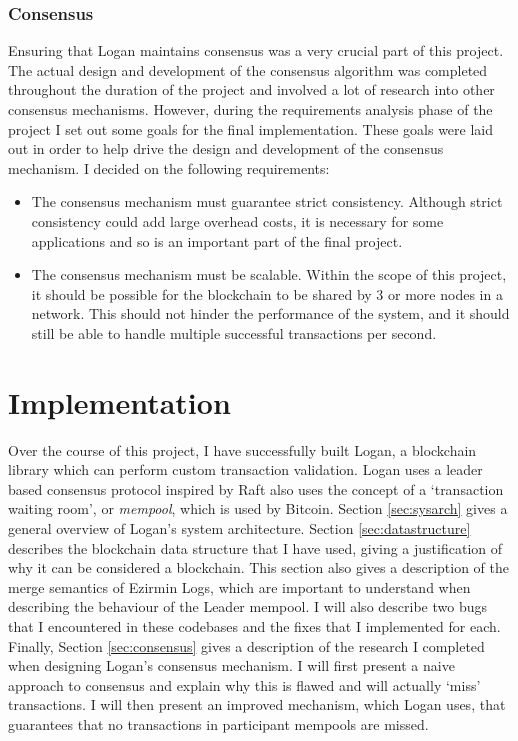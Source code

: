 \documentclass[12pt,a4paper,twoside,openright]{report}
\begin{document}
	\subsection{Consensus}
	Ensuring that Logan maintains consensus was a very crucial part of this project. 
	The actual design and development of the consensus algorithm was completed throughout the duration of the project and involved a lot of research into other consensus mechanisms.
	However, during the requirements analysis phase of the project I set out some goals for the final implementation.
	These goals were laid out in order to help drive the design and development of the consensus mechanism. 
	I decided on the following requirements:
	\begin{itemize}
		\item The consensus mechanism must guarantee strict consistency. Although strict consistency could add large overhead costs, it is necessary for some applications and so is an important part of the final project.
		\item The consensus mechanism must be scalable. Within the scope of this project, it should be possible for the blockchain to be shared by 3 or more nodes in a network. This should not hinder the performance of the system, and it should still be able to handle multiple successful transactions per second.
	\end{itemize}

	\chapter{Implementation} \label{Implementation}
	Over the course of this project, I have successfully built Logan, a blockchain library which can perform custom transaction validation.
	Logan uses a leader based consensus protocol inspired by Raft also uses the concept of a `transaction waiting room', or \textit{mempool}, which is used by Bitcoin.
	Section \ref{sec:sysarch} gives a general overview of Logan's system architecture.
	Section \ref{sec:datastructure} describes the blockchain data structure that I have used, giving a justification of why it can be considered a blockchain.
	This section also gives a description of the merge semantics of Ezirmin Logs, which are important to understand when describing the behaviour of the Leader mempool. 
	I will also describe two bugs that I encountered in these codebases and the fixes that I implemented for each.
	Finally, Section \ref{sec:consensus} gives a description of the research I completed when designing Logan's consensus mechanism. 
	I will first present a naive approach to consensus and explain why this is flawed and will actually `miss' transactions.
	I will then present an improved mechanism, which Logan uses, that guarantees that no transactions in participant mempools are missed.
\end{document}
